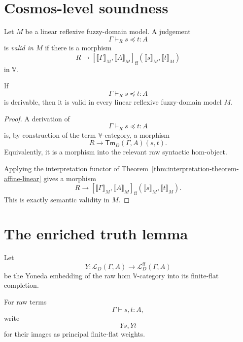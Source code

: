 \section{Cosmos-level soundness}
\label{sec:cosmos-level-soundness}

\begin{definition}
\label{def:semantic-validity-evidence-judgements}
Let \(M\) be a linear reflexive fuzzy-domain model.  A judgement
\[
    \Gamma\vdash_R s\preceq t:A
\]
is \emph{valid in \(M\)} if there is a morphism
\[
    R
    \longrightarrow
    [\llbracket \Gamma\rrbracket_M,
     \llbracket A\rrbracket_M]_{\mathrm{ff}}
    (\llbracket s\rrbracket_M,\llbracket t\rrbracket_M)
\]
in \(\mathbb V\).
\end{definition}

\begin{theorem}
\label{thm:cosmos-level-soundness}
If
\[
    \Gamma\vdash_R s\preceq t:A
\]
is derivable, then it is valid in every linear reflexive fuzzy-domain model
\(M\).
\end{theorem}

\begin{proof}
A derivation of
\[
    \Gamma\vdash_R s\preceq t:A
\]
is, by construction of the term \(\mathbb V\)-category, a morphism
\[
    R
    \longrightarrow
    \mathsf{Tm}_D(\Gamma,A)(s,t).
\]
Equivalently, it is a morphism into the relevant raw syntactic hom-object.

Applying the interpretation functor of
Theorem~\ref{thm:interpretation-theorem-affine-linear} gives a morphism
\[
    R
    \longrightarrow
    [\llbracket \Gamma\rrbracket_M,
     \llbracket A\rrbracket_M]_{\mathrm{ff}}
    (\llbracket s\rrbracket_M,\llbracket t\rrbracket_M).
\]
This is exactly semantic validity in \(M\).
\end{proof}

\section{The enriched truth lemma}
\label{sec:enriched-truth-lemma}

Let
\[
    Y:
    \mathcal L_D(\Gamma,A)
    \longrightarrow
    \mathcal L_D^{\mathrm{ff}}(\Gamma,A)
\]
be the Yoneda embedding of the raw hom \(\mathbb V\)-category into its
finite-flat completion.

For raw terms
\[
    \Gamma\vdash s,t:A,
\]
write
\[
    Ys,Yt
\]
for their images as principal finite-flat weights.


